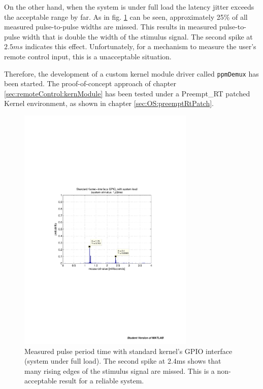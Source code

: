 On the other hand, when the system is under full load the latency jitter exceeds the acceptable range by far. As in fig. \ref{fig:remoteControl:results:stdKernLoad} can be seen, approximately 25\% of all measured pulse-to-pulse widths are missed. This results in measured pulse-to-pulse width that is double the width of the stimulus signal. The second spike at $2.5ms$ indicates this effect. Unfortunately, for a mechanism to measure the user's remote control input, this is a unacceptable situation.

Therefore, the development of a custom kernel module driver called \texttt{ppmDemux} has been started. The proof-of-concept approach of chapter \ref{sec:remoteControl:kernModule} has been tested under a Preempt\_RT patched Kernel environment, as shown in chapter \ref{sec:OS:preemptRtPatch}.

\begin{figure}[H]
    \centering
    \includegraphics[width=0.75\textwidth]{fig/ch-ppm-kernel-driver/stdKern_withLoad}
    \caption[Measured pulse period time with standard kernel (system under full load)]{Measured pulse period time with standard kernel's GPIO interface (system under full load). The second spike at 2.4ms shows that many rising edges of the stimulus signal are missed. This is a non-acceptable result for a reliable system.}
    \label{fig:remoteControl:results:stdKernLoad}
\end{figure}

